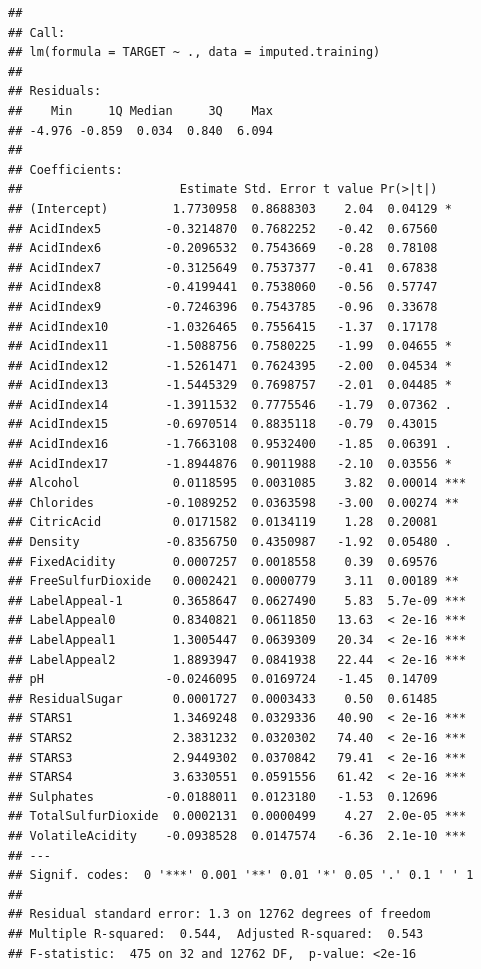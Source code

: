 \documentclass[]{article}
\begin{document}
\begin{verbatim}
## 
## Call:
## lm(formula = TARGET ~ ., data = imputed.training)
## 
## Residuals:
##    Min     1Q Median     3Q    Max 
## -4.976 -0.859  0.034  0.840  6.094 
## 
## Coefficients:
##                      Estimate Std. Error t value Pr(>|t|)    
## (Intercept)         1.7730958  0.8688303    2.04  0.04129 *  
## AcidIndex5         -0.3214870  0.7682252   -0.42  0.67560    
## AcidIndex6         -0.2096532  0.7543669   -0.28  0.78108    
## AcidIndex7         -0.3125649  0.7537377   -0.41  0.67838    
## AcidIndex8         -0.4199441  0.7538060   -0.56  0.57747    
## AcidIndex9         -0.7246396  0.7543785   -0.96  0.33678    
## AcidIndex10        -1.0326465  0.7556415   -1.37  0.17178    
## AcidIndex11        -1.5088756  0.7580225   -1.99  0.04655 *  
## AcidIndex12        -1.5261471  0.7624395   -2.00  0.04534 *  
## AcidIndex13        -1.5445329  0.7698757   -2.01  0.04485 *  
## AcidIndex14        -1.3911532  0.7775546   -1.79  0.07362 .  
## AcidIndex15        -0.6970514  0.8835118   -0.79  0.43015    
## AcidIndex16        -1.7663108  0.9532400   -1.85  0.06391 .  
## AcidIndex17        -1.8944876  0.9011988   -2.10  0.03556 *  
## Alcohol             0.0118595  0.0031085    3.82  0.00014 ***
## Chlorides          -0.1089252  0.0363598   -3.00  0.00274 ** 
## CitricAcid          0.0171582  0.0134119    1.28  0.20081    
## Density            -0.8356750  0.4350987   -1.92  0.05480 .  
## FixedAcidity        0.0007257  0.0018558    0.39  0.69576    
## FreeSulfurDioxide   0.0002421  0.0000779    3.11  0.00189 ** 
## LabelAppeal-1       0.3658647  0.0627490    5.83  5.7e-09 ***
## LabelAppeal0        0.8340821  0.0611850   13.63  < 2e-16 ***
## LabelAppeal1        1.3005447  0.0639309   20.34  < 2e-16 ***
## LabelAppeal2        1.8893947  0.0841938   22.44  < 2e-16 ***
## pH                 -0.0246095  0.0169724   -1.45  0.14709    
## ResidualSugar       0.0001727  0.0003433    0.50  0.61485    
## STARS1              1.3469248  0.0329336   40.90  < 2e-16 ***
## STARS2              2.3831232  0.0320302   74.40  < 2e-16 ***
## STARS3              2.9449302  0.0370842   79.41  < 2e-16 ***
## STARS4              3.6330551  0.0591556   61.42  < 2e-16 ***
## Sulphates          -0.0188011  0.0123180   -1.53  0.12696    
## TotalSulfurDioxide  0.0002131  0.0000499    4.27  2.0e-05 ***
## VolatileAcidity    -0.0938528  0.0147574   -6.36  2.1e-10 ***
## ---
## Signif. codes:  0 '***' 0.001 '**' 0.01 '*' 0.05 '.' 0.1 ' ' 1
## 
## Residual standard error: 1.3 on 12762 degrees of freedom
## Multiple R-squared:  0.544,  Adjusted R-squared:  0.543 
## F-statistic:  475 on 32 and 12762 DF,  p-value: <2e-16
\end{verbatim}
\end{document}
